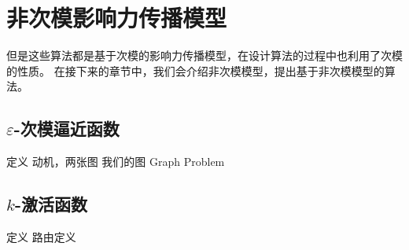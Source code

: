 
\chapter{非次模影响力传播模型}

但是这些算法都是基于次模的影响力传播模型，在设计算法的过程中也利用了次模的性质。
在接下来的章节中，我们会介绍非次模模型，提出基于非次模模型的算法。

\section{$\varepsilon$-次模逼近函数}

定义
动机，两张图
我们的图
Graph
Problem

\section{$k$-激活函数}

定义
路由定义





